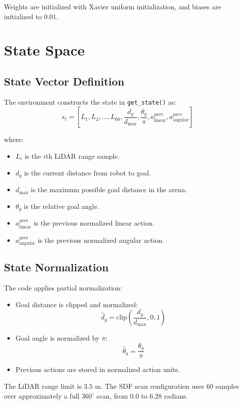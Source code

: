 \documentclass[11pt,a4paper]{article}
\begin{document}
Weights are initialized with Xavier uniform initialization, and biases are initialized to $0.01$.

\section{State Space}

\subsection{State Vector Definition}

The environment constructs the state in \texttt{get\_state()} as:
\[
    s_t =
    \left[
    L_1, L_2, \ldots, L_{60},
    \frac{d_g}{d_{\max}},
    \frac{\theta_g}{\pi},
    a^{\text{prev}}_{\text{linear}},
    a^{\text{prev}}_{\text{angular}}
    \right]
\]

where:
\begin{itemize}[noitemsep]
    \item $L_i$ is the $i$th LiDAR range sample.
    \item $d_g$ is the current distance from robot to goal.
    \item $d_{\max}$ is the maximum possible goal distance in the arena.
    \item $\theta_g$ is the relative goal angle.
    \item $a^{\text{prev}}_{\text{linear}}$ is the previous normalized linear action.
    \item $a^{\text{prev}}_{\text{angular}}$ is the previous normalized angular action.
\end{itemize}

\subsection{State Normalization}

The code applies partial normalization:
\begin{itemize}[noitemsep]
    \item Goal distance is clipped and normalized:
    \[
        \hat{d}_g = \text{clip}\left(\frac{d_g}{d_{\max}}, 0, 1\right)
    \]
    \item Goal angle is normalized by $\pi$:
    \[
        \hat{\theta}_g = \frac{\theta_g}{\pi}
    \]
    \item Previous actions are stored in normalized action units.
\end{itemize}

The LiDAR range limit is $3.5$ m. The SDF scan configuration uses $60$ samples over approximately a full $360^\circ$ scan, from $0.0$ to $6.28$ radians.
\end{document}
